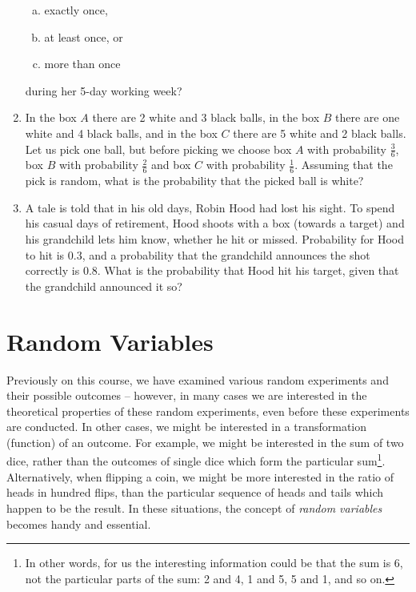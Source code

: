 \documentclass[12pt,a4paper,leqno]{report}
\theoremstyle{plain}
\theoremstyle{definition}
\begin{document}
\begin{enumerate}
\begin{enumerate}[a)]
\item exactly once,
\item at least once, or
\item more than once
\end{enumerate}
during her 5-day working week? 
\item In the box $A$ there are 2 white and 3 black balls, in the box $B$ there are one white and 4 black balls, and in the box $C$ there are 5 white and 2 black balls. Let us pick one ball, but before picking we choose box $A$ with probability $\frac{3}{6}$, box $B$ with probability $\frac{2}{6}$ and box $C$ with probability $\frac{1}{6}$. Assuming that the pick is random, what is the probability that the picked ball is white?
\item A tale is told that in his old days, Robin Hood had lost his sight. To spend his casual days of retirement, Hood shoots with a box (towards a target) and his grandchild lets him know, whether he hit or missed. Probability for Hood to hit is $0.3$, and a probability that the grandchild announces the shot correctly is $0.8$. What is the probability that Hood hit his target, given that the grandchild announced it so?
\end{enumerate}


\chapter{Random Variables}\label{sm}

Previously on this course, we have examined various random experiments and their possible outcomes -- however, in many cases we are interested in the theoretical properties of these random experiments, even before these experiments are conducted. In other cases, we might be interested in a transformation (function) of an outcome. For example, we might be interested in the sum of two dice, rather than the outcomes of single dice which form the particular sum\footnote{In other words, for us the interesting information could be that the sum is $6$, not the particular parts of the sum: 2 and 4, 1 and 5, 5 and 1, and so on.}. Alternatively, when flipping a coin, we might be more interested in the ratio of heads in hundred flips, than the particular sequence of heads and tails which happen to be the result. In these situations, the concept of \emph{random variables} becomes handy and essential.
\end{document}

